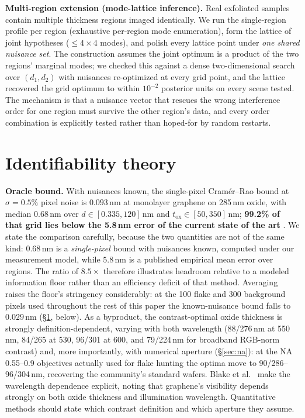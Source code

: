 \documentclass[10pt]{article}
\begin{document}
\textbf{Multi-region extension (mode-lattice inference).} Real exfoliated samples contain multiple thickness regions imaged identically. We run the single-region profile per region (exhaustive per-region mode enumeration), form the lattice of joint hypotheses ($\le 4\times4$ modes), and polish every lattice point under \emph{one shared nuisance set}. The construction assumes the joint optimum is a product of the two regions' marginal modes; we checked this against a dense two-dimensional search over $(d_1,d_2)$ with nuisances re-optimized at every grid point, and the lattice recovered the grid optimum to within $10^{-2}$ posterior units on every scene tested. The mechanism is that a nuisance vector that rescues the wrong interference order for one region must survive the other region's data, and every order combination is explicitly tested rather than hoped-for by random restarts.

\section{Identifiability theory}\label{sec:theory}

\textbf{Oracle bound.} With nuisances known, the single-pixel Cram\'er--Rao bound at $\sigma=0.5\%$ pixel noise is $0.093$\,nm at monolayer graphene on 285\,nm oxide, with median $0.68$\,nm over $d\in[0.335,120]$\,nm and $t_{\mathrm{ox}}\in[50,350]$\,nm; \textbf{99.2\% of that grid lies below the 5.8\,nm error of the current state of the art} \cite{phiadapt2025}. We state the comparison carefully, because the two quantities are not of the same kind: $0.68$\,nm is a \emph{single-pixel} bound with nuisances known, computed under our measurement model, while $5.8$\,nm is a published empirical mean error over regions. The ratio of $8.5\times$ therefore illustrates headroom relative to a modeled information floor rather than an efficiency deficit of that method. Averaging raises the floor's stringency considerably: at the 100 flake and 300 background pixels used throughout the rest of this paper the known-nuisance bound falls to $0.029$\,nm (\S\ref{sec:theory}, below). As a byproduct, the contrast-optimal oxide thickness is strongly definition-dependent, varying with both wavelength (88/276\,nm at 550\,nm, 84/265 at 530, 96/301 at 600, and 79/224\,nm for broadband RGB-norm contrast) and, more importantly, with numerical aperture (\S\ref{sec:na}): at the NA\,0.55--0.9 objectives actually used for flake hunting the optima move to 90/286--96/304\,nm, recovering the community's standard wafers. Blake et al.\ \cite{blake2007} make the wavelength dependence explicit, noting that graphene's visibility depends strongly on both oxide thickness and illumination wavelength. Quantitative methods should state which contrast definition and which aperture they assume.
\end{document}
